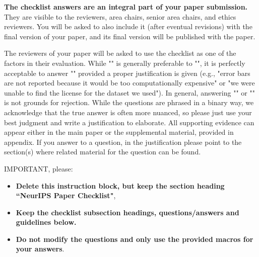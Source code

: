\documentclass{article}
\theoremstyle{plain}
\theoremstyle{definition}
\theoremstyle{remark}
\begin{document}
{\bf The checklist answers are an integral part of your paper submission.} They are visible to the reviewers, area chairs, senior area chairs, and ethics reviewers. You will be asked to also include it (after eventual revisions) with the final version of your paper, and its final version will be published with the paper.

The reviewers of your paper will be asked to use the checklist as one of the factors in their evaluation. While "\answerYes{}" is generally preferable to "\answerNo{}", it is perfectly acceptable to answer "\answerNo{}" provided a proper justification is given (e.g., "error bars are not reported because it would be too computationally expensive" or "we were unable to find the license for the dataset we used"). In general, answering "\answerNo{}" or "\answerNA{}" is not grounds for rejection. While the questions are phrased in a binary way, we acknowledge that the true answer is often more nuanced, so please just use your best judgment and write a justification to elaborate. All supporting evidence can appear either in the main paper or the supplemental material, provided in appendix. If you answer \answerYes{} to a question, in the justification please point to the section(s) where related material for the question can be found.

IMPORTANT, please:
\begin{itemize}
    \item {\bf Delete this instruction block, but keep the section heading ``NeurIPS Paper Checklist"},
    \item  {\bf Keep the checklist subsection headings, questions/answers and guidelines below.}
    \item {\bf Do not modify the questions and only use the provided macros for your answers}.
\end{itemize} 
 

\end{document}
